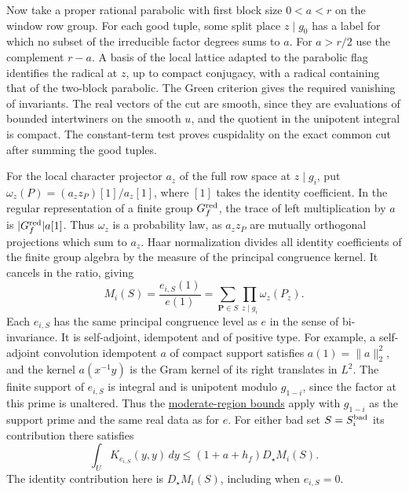 Now take a proper rational parabolic with first block size
\(0<a<r\) on the window row group. For each good tuple, some
split place \(z\mid g_0\) has a label for which no subset of
the irreducible factor degrees sums to \(a\). For \(a>r/2\)
use the complement \(r-a\). A basis of the local lattice
adapted to the parabolic flag identifies the radical at
\(z\), up to compact conjugacy, with a radical containing
that of the two-block parabolic. The Green criterion gives
the required vanishing of invariants. The real vectors of
the cut are smooth, since they are evaluations of bounded
intertwiners on the smooth \(u\), and the quotient in the
unipotent integral is compact. The constant-term test proves
cuspidality on the exact common cut after summing the good
tuples.

For the local character projector \(a_z\) of the full row space at
\(z\mid g_i\), put \(\omega_z(P)=(a_z z_P)[1]/a_z[1]\), where
\([1]\) takes the identity coefficient. In the regular representation
of a finite group \(G_f^{\rm red}\), the trace of left multiplication
by \(a\) is \(|G_f^{\rm red}|a[1]\). Thus \(\omega_z\) is a
probability law, as \(a_z z_P\) are mutually orthogonal projections
which sum to \(a_z\). Haar normalization divides all identity
coefficients of the finite group algebra by the measure of the
principal congruence kernel. It cancels in the ratio, giving
\[
 M_i(S)=\frac{e_{i,S}(1)}{e(1)}
       =\sum_{\boldsymbol{P}\in S}\prod_{z\mid g_i}\omega_z(P_z).
\]
Each \(e_{i,S}\) has the same principal congruence level as \(e\) in the
sense of bi-invariance. It is self-adjoint, idempotent and of positive
type. For example, a self-adjoint convolution idempotent \(a\) of
compact support satisfies \(a(1)=\|a\|_2^2\), and the kernel
\(a(x^{-1}y)\) is the Gram kernel of its right translates in \(L^2\).
The finite support of \(e_{i,S}\) is integral and is unipotent modulo
\(g_{1-i}\), since the factor at this prime is unaltered. Thus the
\hyperlink{proof.one-sided-row-count}{moderate-region bounds} apply with
\(g_{1-i}\) as the support prime and the same real data as for \(e\).
For either bad set \(S=S_i^{\rm bad}\) its contribution there satisfies
\[
  \int_U K_{e_{i,S}}(y,y)\,dy\le (1+a+h_f)D_\star M_i(S).
\]
The identity contribution here is \(D_\star M_i(S)\), including
when \(e_{i,S}=0\).

